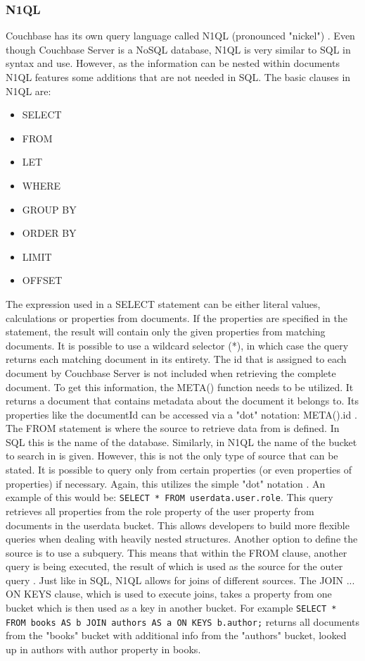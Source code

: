 \subsubsection{N1QL} \label{n1ql}
Couchbase has its own query language called N1QL (pronounced "nickel") \parencite{couchbaseDocN1Ql}. Even though Couchbase Server is a NoSQL database, N1QL is very similar to SQL in syntax and use. However, as the information can be nested within documents N1QL features some additions that are not needed in SQL. The basic clauses in N1QL are: 
\begin{itemize}
    \item SELECT
    \item FROM
    \item LET
    \item WHERE
    \item GROUP BY
    \item ORDER BY
    \item LIMIT
    \item OFFSET
\end{itemize}
The expression used in a SELECT statement can be either literal values, calculations or properties from documents. If the properties are specified in the statement, the result will contain only the given properties from matching documents. It is possible to use a wildcard selector (*), in which case the query returns each matching document in its entirety. The id that is assigned to each document by Couchbase Server is not included when retrieving the complete document. To get this information, the META() function needs to be utilized. It returns a document that contains metadata about the document it belongs to. Its properties like the documentId can be accessed via a "dot" notation: META().id \parencite{proCouchbaseServer}.\\
The FROM statement is where the source to retrieve data from is defined. In SQL this is the name of the database. Similarly, in N1QL the name of the bucket to search in is given. However, this is not the only type of source that can be stated. It is possible to query only from certain properties (or even properties of properties) if necessary. Again, this utilizes the simple "dot" notation  \parencite{proCouchbaseServer}. An example of this would be: \texttt{SELECT * FROM userdata.user.role}. This query retrieves all properties from the role property of the user property from documents in the userdata bucket. This allows developers to build more flexible queries when dealing with heavily nested structures. Another option to define the source is to use a subquery. This means that within the FROM clause, another query is being executed, the result of which is used as the source for the outer query \parencite{couchbaseDocN1Ql}. Just like in SQL, N1QL allows for joins of different sources. The JOIN ... ON KEYS clause, which is used to execute joins, takes a property from one bucket which is then used as a key in another bucket. For example \texttt{SELECT * FROM books AS b JOIN authors AS a ON KEYS b.author;} returns all documents from the "books" bucket with additional info from the "authors" bucket, looked up in authors with author property in books. \\
